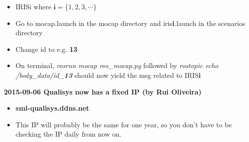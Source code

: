 \begin{itemize}
	
	\item IRISi where $\textbf{i} = \{1,2,3, \cdots\}$

	\item Go to mocap.launch in the mocap directory and iris\textbf{i}.launch in the scenarios directory
	
	\item Change id to e.g. \textbf{13} 
	
	\item On terminal, \textit{rosrun mocap ros\_mocap.py} followed by \textit{rostopic echo /body\_data/id\_\textbf{13}} should now yield the msg related to IRIS\textbf{i} 
\end{itemize}


\vspace{1cm}

\textbf{2015-09-06 Qualisys now has a fixed IP (by Rui Oliveira)}

\begin{itemize}
	\item \textbf{sml-qualisys.ddns.net}
	\item This IP will probably be the same for one year, so you don't have to be checking the IP daily from now on.
\end{itemize}

